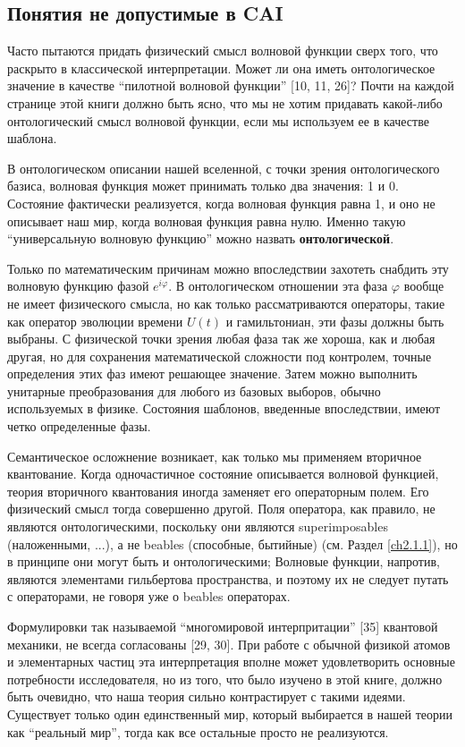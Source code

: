 \documentclass[main.tex]{subfiles}
\begin{document}
\subsection{Понятия не допустимые в CAI}\label{ch3.3}

Часто пытаются придать физический смысл волновой функции сверх того, что раскрыто в классической интерпретации. Может ли она иметь онтологическое значение в качестве ``пилотной волновой функции'' [10, 11, 26]? Почти на каждой странице этой книги должно быть ясно, что мы не хотим придавать какой-либо онтологический смысл волновой функции, если мы используем ее в качестве шаблона.

В онтологическом описании нашей вселенной, с точки зрения онтологического базиса, волновая функция может принимать только два значения: 1 и 0. Состояние фактически реализуется, когда волновая функция равна 1, и оно не описывает наш мир, когда волновая функция равна нулю. Именно такую ``универсальную волновую функцию'' можно назвать \textbf{онтологической}.

Только по математическим причинам можно впоследствии захотеть снабдить эту волновую функцию фазой $e^{i\varphi}$. В онтологическом отношении эта фаза $\varphi$ вообще не имеет физического смысла, но как только рассматриваются операторы, такие как оператор эволюции времени $U(t)$ и гамильтониан, эти фазы должны быть выбраны. С физической точки зрения любая фаза так же хороша, как и любая другая, но для сохранения математической сложности под контролем, точные определения этих фаз имеют решающее значение. Затем можно выполнить унитарные преобразования для любого из базовых выборов, обычно используемых в физике. Состояния шаблонов, введенные впоследствии, имеют четко определенные фазы.

Семантическое осложнение возникает, как только мы применяем вторичное квантование. Когда одночастичное состояние описывается волновой функцией, теория вторичного квантования иногда заменяет его операторным полем. Его физический смысл тогда совершенно другой. Поля оператора, как правило, не являются онтологическими, поскольку они являются superimposables (наложенными, ...), а не beables (способные, бытийные) (см. Раздел \ref{ch2.1.1}), но в принципе они могут быть и онтологическими; Волновые функции, напротив, являются элементами гильбертова пространства, и поэтому их не следует путать с операторами, не говоря уже о beables операторах.

Формулировки так называемой ``многомировой интерпритации'' [35] квантовой механики, не всегда согласованы [29, 30]. При работе с обычной физикой атомов и элементарных частиц эта интерпретация вполне может удовлетворить основные потребности исследователя, но из того, что было изучено в этой книге, должно быть очевидно, что наша теория сильно контрастирует с такими идеями. Существует только один единственный мир, который выбирается в нашей теории как ``реальный мир'', тогда как все остальные просто не реализуются.
\end{document}
